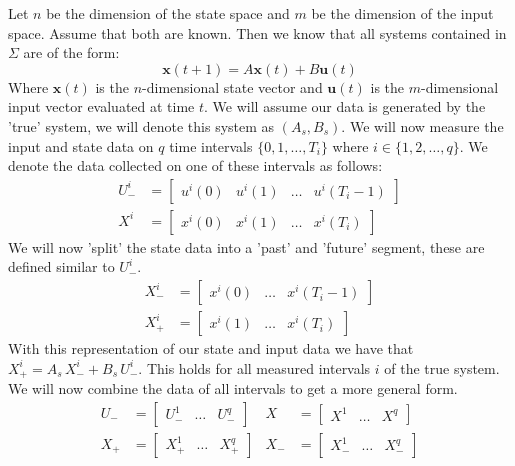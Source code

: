 Let $n$ be the dimension of the state space and $m$ be the dimension of the input space. Assume that both are known. Then we know that all systems contained in $\Sigma$ are of the form:
\begin{equation}
	\label{isSystem}
	\mathbf{x}(t+1) = A \mathbf{x}(t) + B \mathbf{u}(t)
\end{equation}
Where $\mathbf{x}(t)$ is the $n$-dimensional state vector and $\mathbf{u}(t)$ is the $m$-dimensional input vector evaluated at time $t$. We will assume our data is generated by the 'true' system, we will denote this system as $(A_s , B_s)$. We will now measure the input and state data on $q$ time intervals $\{0,1,\dots,T_i\}$ where $i \in \{1,2,\dots,q\}$. We denote the data collected on one of these intervals as follows:
\begin{align*}
	U^{i}_{-} &= \left[ \begin{array}{cccc} u^{i}(0) & u^{i}(1) & \dots & u^{i}(T_i - 1) \end{array} \right] \\
	X^{i}     &= \left[ \begin{array}{cccc} x^{i}(0) & x^{i}(1) & \dots & x^{i}(T_i) \end{array} \right]
\end{align*}
We will now 'split' the state data into a 'past' and 'future' segment, these are defined similar to $U^i_-$.
\begin{align*}
	X^{i}_{-} &= \left[ \begin{array}{ccc} x^{i}(0) & \dots & x^{i}(T_i - 1) \end{array} \right] \\
	X^{i}_{+} &= \left[ \begin{array}{ccc} x^{i}(1) & \dots & x^{i}(T_i) \end{array} \right]
\end{align*}
With this representation of our state and input data we have that $X^{i}_{+} = A_s \, X^{i}_{-} + B_s \, U^{i}_{-}$. This holds for all measured intervals $i$ of the true system. We will now combine the data of all intervals to get a more general form.
\begin{align*}
	U_{-} &= \left[ \begin{array}{ccc} U^{1}_{-} & \dots & U^{q}_{-} \end{array} \right] &
	X     &= \left[ \begin{array}{ccc} X^{1} & \dots & X^{q} \end{array} \right] \\
	X_{+} &= \left[ \begin{array}{ccc} X^{1}_{+} & \dots & X^{q}_{+} \end{array} \right] &
	X_{-} &= \left[ \begin{array}{ccc} X^{1}_{-} & \dots & X^{q}_{-} \end{array} \right]
\end{align*}
